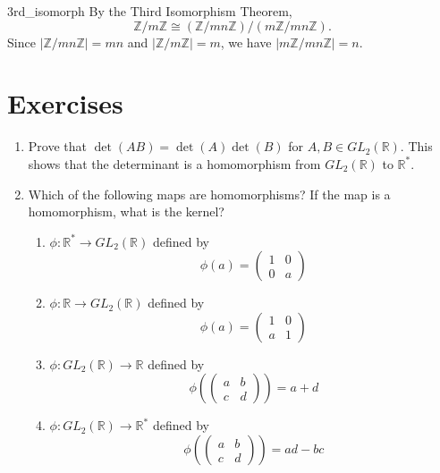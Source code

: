  
\begin{example}{3rd_isomorph}
By the Third Isomorphism Theorem,
\[
{\mathbb Z} / m {\mathbb Z} \cong ({\mathbb Z}/ mn {\mathbb Z})/ (m {\mathbb Z}/ mn
{\mathbb Z}). 
\]
Since $| {\mathbb Z} / mn {\mathbb Z} | = mn$ and  $|{\mathbb Z} / m{\mathbb Z}| =
m$, we have $| m {\mathbb Z} / mn {\mathbb Z}| = n$. 
\end{example}
 
 
\section*{Exercises}
\exrule
 
 
 
{\small
 
 
\begin{enumerate}
 
 
 
\item
Prove that $\det( AB) = \det(A) \det(B)$ for $A, B \in GL_2( {\mathbb R}
)$. This shows that the determinant is a homomorphism from $GL_2(
{\mathbb R} )$ to ${\mathbb R}^*$. 
 
 
 
\item
Which of the following maps are homomorphisms? If the map is a
homomorphism, what is the kernel? 
\begin{enumerate}
 
 \item
$\phi : {\mathbb R}^\ast \rightarrow GL_2 ( {\mathbb R})$ defined by
\[
\phi( a ) =
\begin{pmatrix}
1 & 0 \\
0 & a
\end{pmatrix}
\]
 
 \item
$\phi : {\mathbb R} \rightarrow GL_2 ( {\mathbb R})$ defined by
\[
\phi( a ) =
\begin{pmatrix}
1 & 0 \\
a & 1
\end{pmatrix}
\]
 
 \item
$\phi : GL_2 ({\mathbb R})   \rightarrow {\mathbb R}$ defined by
\[
\phi
\left(
\begin{pmatrix}
a & b \\
c & d
\end{pmatrix}
\right)
= a + d
\]
 
 \item
$\phi : GL_2 ( {\mathbb R})   \rightarrow {\mathbb R}^\ast$ defined by 
\[
\phi
\left(
\begin{pmatrix}
a & b \\
c & d
\end{pmatrix}
\right)
= ad -bc
\]
 

\end{enumerate}
\end{enumerate}}
